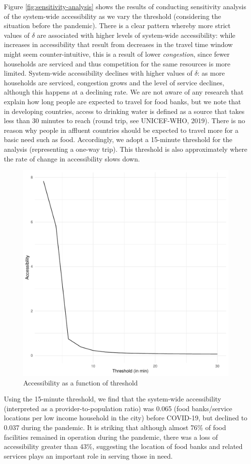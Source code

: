 \documentclass[]{elsarticle} %
\begin{document}
Figure \ref{fig:sensitivity-analysis} shows the results of conducting
sensitivity analysis of the system-wide accessibility as we vary the
threshold (considering the situation before the pandemic). There is a
clear pattern whereby more strict values of \(\delta\) are associated
with higher levels of system-wide accessibility: while increases in
accessibility that result from decreases in the travel time window might
seem counter-intuitive, this is a result of lower \emph{congestion},
since fewer households are serviced and thus competition for the same
resources is more limited. System-wide accessibility declines with
higher values of \(\delta\): as more households are serviced, congestion
grows and the level of service declines, although this happens at a
declining rate. We are not aware of any research that explain how long
people are expected to travel for food banks, but we note that in
developing countries, access to drinking water is defined as a source
that takes less than 30 minutes to reach (round trip, see UNICEF-WHO,
2019). There is no reason why people in affluent countries should be
expected to travel more for a basic need such as food. Accordingly, we
adopt a 15-minute threshold for the analysis (representing a one-way
trip). This threshold is also approximately where the rate of change in
accessibility slows down.

\begin{figure}
\includegraphics[width=0.6\linewidth]{Accessibility-Foodbanks-Hamilton_files/figure-latex/plot-results-sensitivity-analysis-1} \caption{\label{fig:sensitivity-analysis}Accessibility as a function of threshold}\label{fig:plot-results-sensitivity-analysis}
\end{figure}

Using the 15-minute threshold, we find that the system-wide
accessibility (interpreted as a provider-to-population ratio) was 0.065
(food banks/service locations per low income household in the city)
before COVID-19, but declined to 0.037 during the pandemic. It is
striking that although almost 76\% of food facilities remained in
operation during the pandemic, there was a loss of accessibility greater
than 43\%, suggesting the location of food banks and related services
plays an important role in serving those in need.
\end{document}

